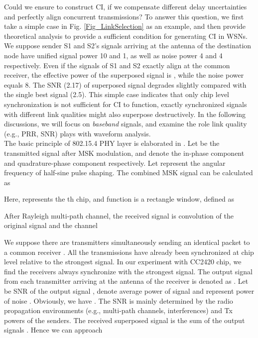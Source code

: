 \documentclass[conference]{IEEEtran}
\begin{document}
\indent Could we ensure to construct CI, if we compensate different delay uncertainties and perfectly align concurrent transmissions? To answer this question, we first take a simple case in Fig. \ref{Fig_LinkSelection} as an example, and then provide theoretical analysis to provide a sufficient condition for generating CI in WSNs.\\
\indent We suppose sender S1 and S2's signals arriving at the antenna of the destination node have unified signal power 10 and 1, as well as noise power 4 and 4 respectively.
Even if the signals of S1 and S2 exactly align at the common receiver, the effective power of the superposed signal is , while the noise power equals 8.
The SNR (2.17) of superposed signal degrades slightly compared with the single best signal (2.5).
This simple case indicates that only chip level synchronization is not sufficient for CI to function, exactly synchronized signals with different link qualities might also superpose destructively.
In the following discussions, we will focus on \emph{baseband} signals, and examine the role link quality (e.g., PRR, SNR) plays with waveform analysis.\\
\indent The basic principle of 802.15.4 PHY layer is elaborated in \cite{oh2006building}. Let  be the transmitted signal after MSK modulation,  and  denote the
in-phase component and quadrature-phase component respectively.
Let   represent the angular frequency of half-sine pulse shaping.
The combined MSK signal can be calculated as


Here,  represents the th chip, and  function is a rectangle window, defined as

After Rayleigh multi-path channel, the received signal  is convolution of the original signal and the channel 

We suppose there are  transmitters  simultaneously sending an identical packet to a common receiver .
All the transmissions have already been synchronized at chip level relative to the strongest signal.
In our experiment with CC2420 chip, we find the receivers always synchronize with the strongest signal.
The output signal from each transmitter  arriving at the antenna of the receiver  is denoted as .
Let  be SNR of the output signal ,  denote average power of signal  and  represent power of noise .
Obviously, we have .
The SNR  is mainly determined by the radio propagation environments (e.g., multi-path channels, interferences) and Tx powers of the senders.
The received superposed signal  is the sum of the  output signals .
Hence we can approach
\end{document}
